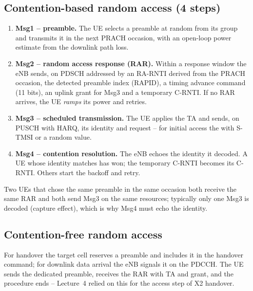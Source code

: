 \documentclass[11pt,a4paper]{article}
\begin{document}
\subsection{Contention-based random access (4 steps)}
\begin{enumerate}
  \item \textbf{Msg1 -- preamble.} The UE selects a preamble at random from its group and transmits
        it in the next PRACH occasion, with an open-loop power estimate from the downlink path loss.
  \item \textbf{Msg2 -- random access response (RAR).} Within a response window the eNB sends, on PDSCH
        addressed by an RA-RNTI derived from the PRACH occasion, the detected preamble index (RAPID), a
        timing advance command (11 bits), an uplink grant for Msg3 and a temporary C-RNTI. If no RAR
        arrives, the UE \emph{ramps} its power and retries.
  \item \textbf{Msg3 -- scheduled transmission.} The UE applies the TA and sends, on PUSCH with HARQ, its
        identity and request -- for initial access the  with S-TMSI or a random
        value.
  \item \textbf{Msg4 -- contention resolution.} The eNB echoes the identity it decoded. A UE whose identity
        matches has won; the temporary C-RNTI becomes its C-RNTI. Others start the backoff and retry.
\end{enumerate}
Two UEs that chose the same preamble in the same occasion both receive the same RAR and both send Msg3
on the same resources; typically only one Msg3 is decoded (capture effect), which is why Msg4 must
echo the identity.

\subsection{Contention-free random access}
For handover the target cell reserves a preamble and includes it in the handover command; for
downlink data arrival the eNB signals it on the PDCCH. The UE sends the dedicated preamble, receives
the RAR with TA and grant, and the procedure ends -- Lecture~4 relied on this for the access step of
X2 handover.
\end{document}
